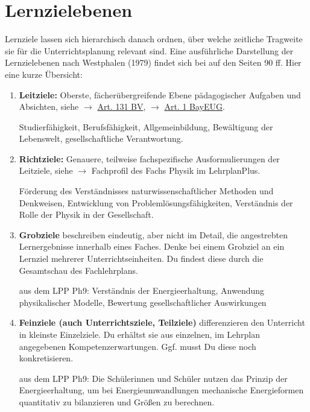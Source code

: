 \section{Lernzielebenen}

Lernziele lassen sich hierarchisch danach ordnen, über welche zeitliche Tragweite sie für die Unterrichtsplanung relevant sind. Eine ausführliche Darstellung der Lernzielebenen nach Westphalen (1979) findet sich bei \textcite{KircherGirwidzHaussler1} auf den Seiten 90 ff. Hier eine kurze Übersicht:

\begin{enumerate}
	\item \textbf{Leitziele:} Oberste, fächerübergreifende Ebene pädagogischer Aufgaben und Absichten, siehe $\to$ \href{https://www.gesetze-bayern.de/Content/Document/BayVerf-131}{Art. 131 BV}, $\to$ \href{https://www.gesetze-bayern.de/Content/Document/BayEUG-1}{Art. 1 BayEUG}.
	\begin{beisp2}
		Studierf\"{a}higkeit, Berufsf\"{a}higkeit, Allgemeinbildung, Bew\"{a}ltigung der Lebenswelt, gesellschaftliche Verantwortung.
	\end{beisp2}

	\item \textbf{Richtziele:} Genauere, teilweise fachspezifische Ausformulierungen der Leitziele, siehe $\to$ Fachprofil des Fachs Physik im LehrplanPlus.
	\begin{beisp2}
		Förderung des Verständnisses naturwissenschaftlicher Methoden und Denkweisen, Entwicklung von Problemlösungsfähigkeiten, Verständnis der Rolle der Physik in der Gesellschaft.
	\end{beisp2}


	\item \textbf{Grobziele} beschreiben eindeutig, aber nicht im Detail, die angestrebten Lernergebnisse innerhalb eines Faches. Denke bei einem Grobziel an ein Lernziel mehrerer Unterrichtseinheiten. Du findest diese durch die Gesamtschau des Fachlehrplans.

	\begin{beisp2}
		aus dem LPP Ph9: Verständnis der Energieerhaltung, Anwendung physikalischer Modelle, Bewertung gesellschaftlicher Auswirkungen
	\end{beisp2}

	\item \textbf{Feinziele (auch Unterrichtsziele, Teilziele)} differenzieren den Unterricht in kleinste Einzelziele. Du erhältst sie aus einzelnen, im Lehrplan angegebenen Kompetenzerwartungen. Ggf. musst Du diese noch konkretisieren.

	\begin{beisp2}
		aus dem LPP Ph9: Die Schülerinnen und Schüler nutzen das Prinzip der Energieerhaltung, um bei Energieumwandlungen mechanische Energieformen quantitativ zu bilanzieren und Größen zu berechnen.
	\end{beisp2}
\end{enumerate}

